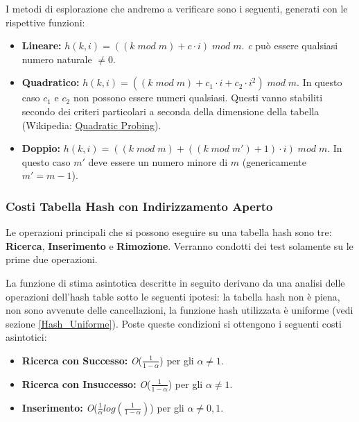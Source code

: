 \documentclass{article}
\newcommand{\bigO}{\emph{O}}
\begin{document}
I metodi di esplorazione che andremo a verificare sono i seguenti, generati con le rispettive funzioni:
\begin{itemize}
\item \textbf{Lineare:} \begin{math} h(k, i) = ((k\; mod\; m) + c \cdot i)\; mod\; m\end{math}. \emph{c} può essere qualsiasi numero naturale $\neq 0$.
\item \textbf{Quadratico:} \begin{math} h(k, i) = ((k\; mod\; m) + c_1 \cdot i + c_2 \cdot i ^ 2)\; mod\; m\end{math}. In questo caso $c_1$ e $c_2$ non possono essere numeri qualsiasi. Questi vanno stabiliti secondo dei criteri particolari a seconda della dimensione della tabella (\label{Esplorazione_Quadratica}Wikipedia: \href{https://en.wikipedia.org/wiki/Quadratic_probing}{Quadratic Probing}).
\item \textbf{Doppio:} \begin{math} h(k, i) = ((k\; mod\; m) + ((k\; mod\; m') + 1) \cdot i)\; mod\; m\end{math}. In questo caso $m'$ deve essere un numero minore di $m$ (genericamente $m' = m - 1$). 
\end{itemize}

\subsubsection{Costi Tabella Hash con Indirizzamento Aperto}
Le operazioni principali che si possono eseguire su una tabella hash sono tre: \textbf{Ricerca}, \textbf{Inserimento} e \textbf{Rimozione}.\hfill
\break
Verranno condotti dei test solamente su le prime due operazioni.

La funzione di stima asintotica descritte in seguito derivano da una analisi delle operazioni dell'hash table sotto le seguenti ipotesi: la tabella hash non è piena, non sono avvenute delle cancellazioni, la funzione hash  utilizzata è uniforme (vedi sezione \ref{Hash_Uniforme}). \hfill
\break
Poste queste condizioni si ottengono i seguenti costi asintotici:
\begin{itemize}
\item \textbf{Ricerca con Successo:} \bigO ($\frac{1}{1 - \alpha} $) per gli $\alpha \neq 1$.
\item \textbf{Ricerca con Insuccesso:} \bigO ($\frac{1}{1 - \alpha} $) per gli $\alpha \neq 1$.
\item \textbf{Inserimento:} \bigO ($\frac{1}{\alpha} log(\frac{1}{1 - \alpha})$) per gli $\alpha \neq 0,1$.

\end{itemize}
\end{document}
